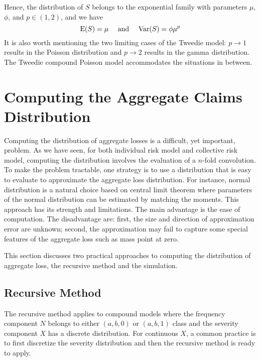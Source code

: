 \documentclass[]{book}
\theoremstyle{definition}
\theoremstyle{definition}
\theoremstyle{definition}
\theoremstyle{remark}
\begin{document}
Hence, the distribution of \(S\) belongs to the exponential family with
parameters \(\mu\), \(\phi\), and \(p\in(1,2)\), and we have
\[{\rm E} (S)=\mu~~~~{\rm and}~~~~{\rm Var} (S)=\phi\mu^{p}\] It is also
worth mentioning the two limiting cases of the Tweedie model:
\(p\rightarrow 1\) results in the Poisson distribution and
\(p\rightarrow 2\) results in the gamma distribution. The Tweedie
compound Poisson model accommodates the situations in between.

\section{Computing the Aggregate Claims
Distribution}\label{computing-the-aggregate-claims-distribution}

Computing the distribution of aggregate losses is a difficult, yet
important, problem. As we have seen, for both individual risk model and
collective risk model, computing the distribution involves the
evaluation of a \(n\)-fold convolution. To make the problem tractable,
one strategy is to use a distribution that is easy to evaluate to
approximate the aggregate loss distribution. For instance, normal
distribution is a natural choice based on central limit theorem where
parameters of the normal distribution can be estimated by matching the
moments. This approach has its strength and limitations. The main
advantage is the ease of computation. The disadvantage are: first, the
size and direction of approximation error are unknown; second, the
approximation may fail to capture some special features of the aggregate
loss such as mass point at zero.

This section discusses two practical approaches to computing the
distribution of aggregate loss, the recursive method and the simulation.

\subsection{Recursive Method}\label{recursive-method}

The recursive method applies to compound models where the frequency
component \(N\) belongs to either \((a,b,0)\) or \((a,b,1)\) class and
the severity component \(X\) has a discrete distribution. For continuous
\(X\), a common practice is to first discretize the severity
distribution and then the recursive method is ready to apply.
\end{document}
